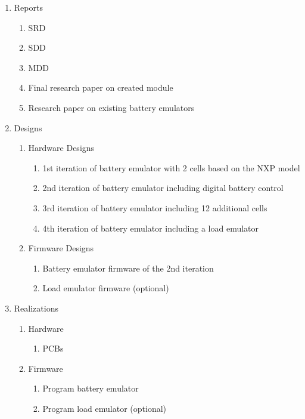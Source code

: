 

\begin{enumerate}
    \item Reports
    \begin{enumerate}
        \item SRD
        \item SDD
        \item MDD
        \item Final research paper on created module
        \item Research paper on existing battery emulators
    \end{enumerate}
    \item Designs
    \begin{enumerate}
        \item Hardware Designs
        \begin{enumerate}
            \item 1st iteration of battery emulator with 2 cells based on the NXP model
            \item 2nd iteration of battery emulator including digital battery control 
            \item 3rd iteration of battery emulator including 12 additional cells 
            \item 4th iteration of battery emulator including a load emulator
        \end{enumerate}
        \item Firmware Designs
        \begin{enumerate}
            \item Battery emulator firmware of the 2nd iteration
            \item Load emulator firmware (optional)
        \end{enumerate}
    \end{enumerate}
    \item Realizations
    \begin{enumerate}
        \item Hardware
        \begin{enumerate}
            \item PCBs
        \end{enumerate}
        \item Firmware
        \begin{enumerate}
            \item Program battery emulator
            \item Program load emulator (optional)
        \end{enumerate}
    \end{enumerate}
\end{enumerate}
